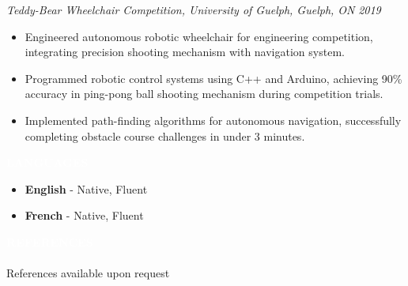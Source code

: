 \documentclass[9pt]{src/developercv}
\begin{document}
  \vspace{1.0\baselineskip}
  
  \textit{Teddy-Bear Wheelchair Competition, University of Guelph, Guelph, ON}
  \hfill \textit{2019}
  \begin{itemize}[leftmargin=2em, itemsep=0.1em]
    \item Engineered autonomous robotic wheelchair for engineering competition,
    integrating precision shooting mechanism with navigation system.
    \item Programmed robotic control systems using C++ and Arduino, achieving
    90\% accuracy in ping-pong ball shooting mechanism during competition
    trials.
    \item Implemented path-finding algorithms for autonomous navigation,
    successfully completing obstacle course challenges in under 3 minutes.
  \end{itemize}

  \vspace{\baselineskip}
  \colorbox{sky600}{\textcolor{white}{\LARGE\MakeUppercase{\textbf{Languages}}}}
  \begin{itemize}[leftmargin=2em, itemsep=0.1em]
    \item \textbf{English} - Native, Fluent
    \item \textbf{French} - Native, Fluent
  \end{itemize}
  \vspace{1.0\baselineskip}

  \colorbox{sky500}{\textcolor{white}{\LARGE\MakeUppercase{\textbf{References}}}}\\\\
  {\large References available upon request}
\end{document}
